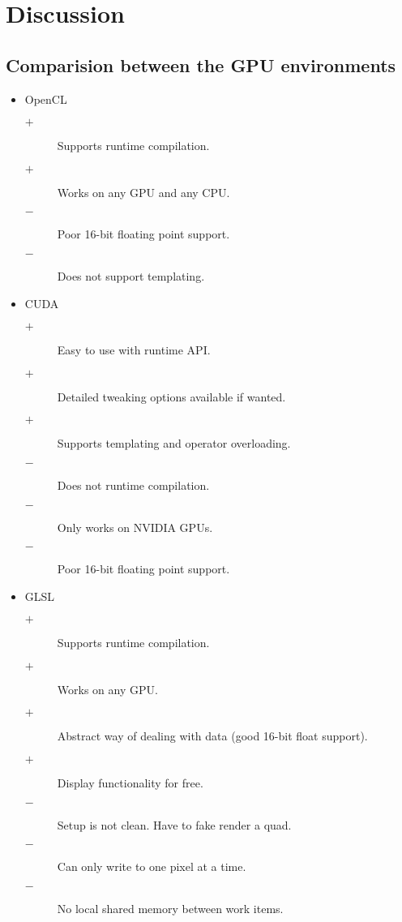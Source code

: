 \section{Discussion}
\subsection{Comparision between the GPU environments}

\begin{itemize}
\item OpenCL
\begin{description}
  \item[$+$] Supports runtime compilation.
  \item[$+$] Works on any GPU and any CPU.
  \item[$-$] Poor 16-bit floating point support.
  \item[$-$] Does not support templating.
\end{description}
\item CUDA
\begin{description}
  \item[$+$] Easy to use with runtime API.
  \item[$+$] Detailed tweaking options available if wanted.
  \item[$+$] Supports templating and operator overloading.
  \item[$-$] Does not runtime compilation.
  \item[$-$] Only works on NVIDIA GPUs.
  \item[$-$] Poor 16-bit floating point support.
\end{description}
\item GLSL
\begin{description}
  \item[$+$] Supports runtime compilation.
  \item[$+$] Works on any GPU.
  \item[$+$] Abstract way of dealing with data (good 16-bit float support).
  \item[$+$] Display functionality for free.
  \item[$-$] Setup is not clean. Have to fake render a quad.
  \item[$-$] Can only write to one pixel at a time.
  \item[$-$] No local shared memory between work items.
\end{description}
\end{itemize}

